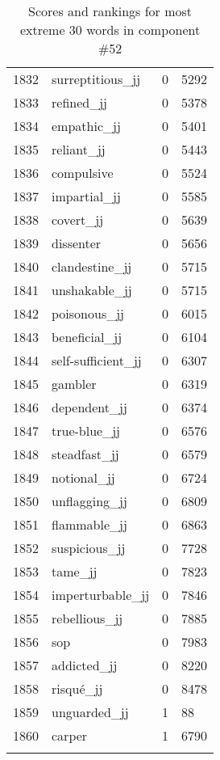 \begin{longtable}[!htbp]{| rlr@{.}l |}
    1832 & surreptitious\_jj & 0 & 5292 \\
    1833 & refined\_jj & 0 & 5378 \\
    1834 & empathic\_jj & 0 & 5401 \\
    1835 & reliant\_jj & 0 & 5443 \\
    1836 & compulsive & 0 & 5524 \\
    1837 & impartial\_jj & 0 & 5585 \\
    1838 & covert\_jj & 0 & 5639 \\
    1839 & dissenter & 0 & 5656 \\
    1840 & clandestine\_jj & 0 & 5715 \\
    1841 & unshakable\_jj & 0 & 5715 \\
    1842 & poisonous\_jj & 0 & 6015 \\
    1843 & beneficial\_jj & 0 & 6104 \\
    1844 & self-sufficient\_jj & 0 & 6307 \\
    1845 & gambler & 0 & 6319 \\
    1846 & dependent\_jj & 0 & 6374 \\
    1847 & true-blue\_jj & 0 & 6576 \\
    1848 & steadfast\_jj & 0 & 6579 \\
    1849 & notional\_jj & 0 & 6724 \\
    1850 & unflagging\_jj & 0 & 6809 \\
    1851 & flammable\_jj & 0 & 6863 \\
    1852 & suspicious\_jj & 0 & 7728 \\
    1853 & tame\_jj & 0 & 7823 \\
    1854 & imperturbable\_jj & 0 & 7846 \\
    1855 & rebellious\_jj & 0 & 7885 \\
    1856 & sop & 0 & 7983 \\
    1857 & addicted\_jj & 0 & 8220 \\
    1858 & risqué\_jj & 0 & 8478 \\
    1859 & unguarded\_jj & 1 & 88 \\
    1860 & carper & 1 & 6790 \\
    \hline
    \caption{Scores and rankings for most extreme 30 words in component \#52} \\
\end{longtable}
